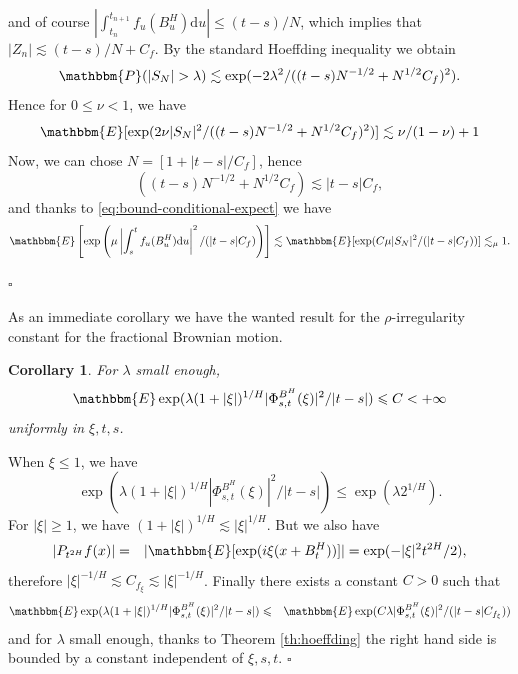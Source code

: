 \documentclass[a4paper,11pt]{article}
\newcommand{\mathd}{\mathrm{d}}
\newcommand{\nosymbol}{}
\newtheorem{corollary}[theorem]{Corollary}
\newenvironment{proof}{{\sc Proof.}}{\hfill$\square$}
\begin{document}
\begin{proof}
  and of course $| \int_{t_{n}^{\nosymbol}}^{t_{n+1}} f_{u} ( B^{H}_{u} )
  \mathd u| \leqslant ( t-s ) /N$, which implies that $| Z_{n} | \lesssim ( t-s
  ) /N+C_{f}$. By the standard Hoeffding inequality we obtain
  \[  \mathbbm{P} ( | S_{N} | > \lambda ) \lesssim \exp ( -2 \lambda^{2} / (
     ( t-s ) N^{-1/2} +N^{1/2} C_{f} )^{2} ). \]
  Hence for $0 \leqslant \nu <1$, we have
  \[ \mathbbm{E} [ \exp ( 2 \nu | S_{N} |^{2} / ( ( t-s ) N^{-1/2} +N^{1/2}
     C_{f} )^{2} ) ] \lesssim \nu / ( 1- \nu ) +1 \]
  Now, we can chose $N= [ 1+ | t-s | /C_{f} ]$, hence
  \[ ( ( t-s ) N^{-1/2} +N^{1/2} C_{f} ) \lesssim | t-s | C_{f} , \]
  and thanks to {\eqref{eq:bound-conditional-expect}} we have
  \[ \mathbbm{E} \left[ \exp \left( \mu \left\lvert \int_{s}^{t} f_{u} ( B^{H}_{u}
     ) \mathd u \right\lvert^{2} / ( | t-s | C_{f} ) \right) \right] \lesssim
     \mathbbm{E} [ \exp ( C \mu | S_{N} |^{2} / ( | t-s | C_{f} ) ) ]
     \lesssim_{\mu} 1.  \]
  
\end{proof}

As an immediate corollary we have the wanted result for the
$\rho$-irregularity constant for the fractional Brownian motion.

\begin{corollary}
  \label{cor:irr-fbm}For $\lambda$ small enough,
  \[ \mathbbm{E}  \exp ( \lambda ( 1+ | \xi | )^{1/H} | \Phi_{s,t}^{B^{H}} (
     \xi ) |^{2} / | t-s | ) \leqslant C<+ \infty \]
  uniformly in $\xi ,t,s$. 
\end{corollary}

\begin{proof}
  When $\xi \leqslant 1$, we have
  \[ \exp ( \lambda ( 1+ | \xi | )^{1/H} | \Phi^{B^{H}}_{s,t} ( \xi ) |^{2} /
     | t-s | ) \leqslant \exp ( \lambda 2^{1/H} ) . \]
  For $| \xi | \geqslant 1$, we have $ ( 1+ | \xi | )^{1/H} \lesssim
  | \xi |^{1/H}$. But we also have
  \begin{eqnarray*}
    | P_{t^{2H}} f ( x ) | & = & | \mathbbm{E} [ \exp ( i \xi ( x+B^{H}_{t} )
    ) ] |
    =  \exp ( - | \xi |^{2} t^{2H} /2 ) ,
  \end{eqnarray*}
  therefore
  $ |\xi|^{-1/H}\lesssim C_{f_{\xi}} \lesssim | \xi |^{-1/H} $. 
  Finally there exists a constant $C>0$ such that
  \begin{eqnarray*}
    \mathbbm{E}  \exp ( \lambda ( 1+ | \xi | )^{1/H} | \Phi_{s,t}^{B^{H}} (
    \xi ) |^{2} / | t-s | ) & \leqslant & \mathbbm{E}  \exp ( C \lambda |
    \Phi_{s,t}^{B^{H}} ( \xi ) |^{2} / ( | t-s | C_{f_{\xi}} ) )
  \end{eqnarray*}
  and for $\lambda$ small enough, thanks to Theorem \ref{th:hoeffding} the right hand side
  is bounded by a constant independent of $\xi ,s,t$.
\end{proof}
\end{document}
